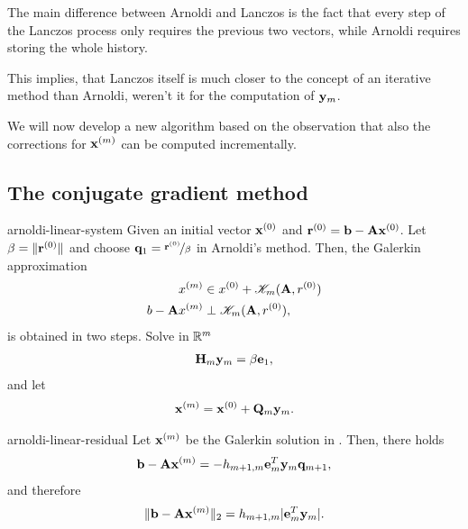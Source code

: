 \begin{remark}
  The main difference between Arnoldi and Lanczos is the fact that
  every step of the Lanczos process only requires the previous two
  vectors, while Arnoldi requires storing the whole history.

  This implies, that Lanczos itself is much closer to the concept of
  an iterative method than Arnoldi, weren't it for the computation of
  $\mathbf y_m$.

  We will now develop a new algorithm based on the observation that
  also the corrections for $\mathbf x^{(m)}$ can be computed incrementally.
\end{remark}



\subsection{The conjugate gradient method}

\begin{Theorem}{arnoldi-linear-system}
  Given an initial vector $\mathbf x^{(0)}$ and
  $\mathbf r^{(0)} = \mathbf b - \mathbf A \mathbf x^{(0)}$. Let $\beta=\lVert\mathbf r^{(0)}\rVert$
  and choose $\mathbf q_1 =\nicefrac{\mathbf r^{(0)}}{\beta}$ in Arnoldi's
  method. Then, the Galerkin approximation
  \begin{align}
    x^{(m)} &\in x^{(0)} + \mathscr K_m(\mathbf A,r^{(0)})\\
    b-\mathbf A x^{(m)} &\perp \mathscr K_m(\mathbf A,r^{(0)}),
  \end{align}
  is obtained in two steps. Solve in $\mathbb R^m$
  \begin{gather}
    \mathbf H_m\mathbf y_m = \beta\mathbf e_1,
  \end{gather}
  and let
  \begin{gather}
    \mathbf x^{(m)} = \mathbf x^{(0)} + \mathbf Q_m \mathbf y_m.
  \end{gather}
\end{Theorem}

\begin{Theorem}{arnoldi-linear-residual}
  Let $\mathbf x^{(m)}$ be the Galerkin solution in
  . Then, there holds
  \begin{gather}
    \mathbf b-\mathbf A\mathbf x^{(m)} = -h_{m+1,m} \mathbf e_m^T \mathbf y_m \mathbf q_{m+1},
  \end{gather}
  and therefore
  \begin{gather}
    \lVert\mathbf b-\mathbf A\mathbf x^{(m)}\rVert_2 = h_{m+1,m} \lvert\mathbf e_m^T \mathbf y_m\rvert.
  \end{gather}  
\end{Theorem}

